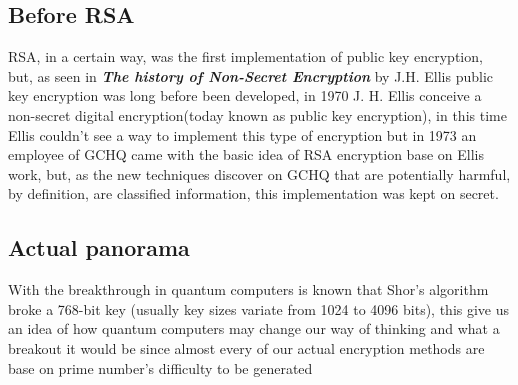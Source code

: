 \documentclass[conference,compsoc, 10pt]{IEEEtran}
\begin{document}
\subsection{Before RSA}
RSA, in a certain way, was the first implementation of public key encryption, but, as seen in \textbf{\textit{The history of Non-Secret Encryption}} by J.H. Ellis public key encryption was long before been developed, in 1970 J. H. Ellis conceive a non-secret digital encryption(today known as public key encryption), in this time Ellis couldn't see a way to implement this type of encryption but in 1973 an employee of GCHQ came with the basic idea of RSA encryption base on Ellis work, but, as the new techniques discover on GCHQ that are potentially harmful, by definition, are classified information, this implementation was kept on secret.

\subsection{Actual panorama}
With the breakthrough in quantum computers is known that Shor's algorithm broke a 768-bit key (usually key sizes variate from 1024 to 4096 bits), this give us an idea of how quantum computers may change our way of thinking and what a breakout it would be since almost every of our actual encryption methods are base on prime number's difficulty to be generated
\end{document}
